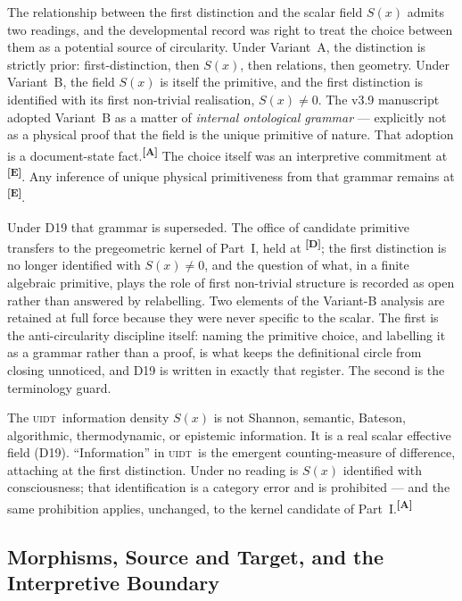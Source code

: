 \documentclass[12pt,a4paper,twoside]{article}
\theoremstyle{plain}
\theoremstyle{definition}
\theoremstyle{remark}
\newcommand{\UIDT}{\textsc{uidt}} %
\newcommand{\catmark}[1]{\textsuperscript{\textsf{\textbf{[#1]}}}}
\begin{document}
The relationship between the first distinction and the scalar field
$S(x)$ admits two readings, and the developmental record was right to
treat the choice between them as a potential source of circularity. Under
Variant~A, the distinction is strictly prior: first-distinction, then
$S(x)$, then relations, then geometry. Under Variant~B, the field
$S(x)$ is itself the primitive, and the first distinction is identified
with its first non-trivial realisation, $S(x)\neq 0$. The v3.9
manuscript adopted Variant~B as a matter of \emph{internal ontological
grammar} --- explicitly not as a physical proof that the field is the
unique primitive of nature. That adoption is a document-state fact.\catmark{A}
The choice itself was an interpretive commitment at \catmark{E}. Any inference
of unique physical primitiveness from that grammar remains at \catmark{E}.

Under D19 that grammar is superseded. The office of candidate primitive
transfers to the pregeometric kernel of Part~I, held at \catmark{D}; the
first distinction is no longer identified with $S(x)\neq 0$, and the
question of what, in a finite algebraic primitive, plays the role of
first non-trivial structure is recorded as open rather than answered by
relabelling. Two elements of the Variant-B analysis are retained at full
force because they were never specific to the scalar. The first is the
anti-circularity discipline itself: naming the primitive choice, and
labelling it as a grammar rather than a proof, is what keeps the
definitional circle from closing unnoticed, and D19 is written in
exactly that register. The second is the terminology guard.

\begin{governancebox}
The \UIDT\ information density $S(x)$ is not Shannon, semantic, Bateson,
algorithmic, thermodynamic, or epistemic information. It is a real
scalar effective field (D19). ``Information'' in \UIDT\ is the emergent
counting-measure of difference, attaching at the first distinction.
Under no reading is $S(x)$ identified with consciousness; that
identification is a category error and is prohibited --- and the same
prohibition applies, unchanged, to the kernel candidate of
Part~I.\catmark{A}
\end{governancebox}

\subsection{Morphisms, Source and Target, and the Interpretive Boundary}
\label{subsec:corrected-sequence}
\end{document}
